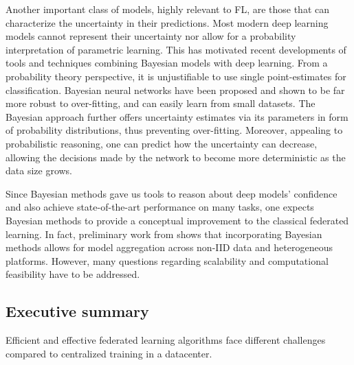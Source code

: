 \documentclass[11pt]{article}
\begin{document}
Another important class of models, highly relevant to FL, are those that can characterize the uncertainty in their predictions. Most modern deep learning models cannot represent their uncertainty nor allow for a probability interpretation of parametric learning. This has motivated recent developments of tools and techniques combining Bayesian models with deep learning. From a probability theory perspective, it is unjustifiable to use single point-estimates for classification. Bayesian neural networks \citep{BL-overview} have been proposed and shown to be far more robust to over-fitting, and can easily learn from small datasets. The Bayesian approach further offers uncertainty estimates via its parameters in form of probability distributions, thus preventing over-fitting. Moreover, appealing to probabilistic reasoning, one can predict how the uncertainty can decrease, allowing the decisions made by the network to become more deterministic as the data size grows. 

Since Bayesian methods gave us tools to reason about deep models’ confidence and also achieve state-of-the-art performance on many tasks, one expects Bayesian methods to provide a conceptual improvement to the classical federated learning. In fact, preliminary work from \citet{BayesFL} shows that incorporating Bayesian methods allows for model aggregation across non-IID data and heterogeneous platforms. However, many questions regarding scalability and computational feasibility have to be addressed.


\subsection{Executive summary}
Efficient and effective federated learning algorithms face different challenges compared to centralized training in a datacenter. 
\end{document}
